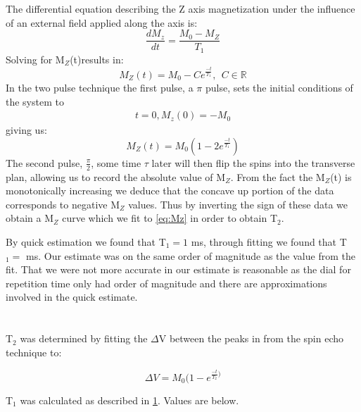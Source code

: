 \documentclass[11pt,letterpaper]{article}
\begin{document}
\section{} %
\label{sec:q3}
The differential equation describing the Z axis magnetization under the influence of an external field applied along the axis is:
\begin{equation}
\frac{dM_z}{dt}=\frac{M_0 - M_Z}{T_1}
\end{equation}
Solving for M$_Z$(t)results in:
\begin{equation}
M_Z(t) = M_0-Ce^{\frac{-t}{T_1}}, \ \ C\in \mathbb{R}
\end{equation}
In the two pulse technique the first pulse, a $\pi$ pulse, sets the initial conditions of the system to 
\begin{align*}
t=0, M_z(0)=-M_0
\end{align*} giving us:
\begin{equation}
\label{eq:Mz}
M_Z(t) = M_0(1-2e^{\frac{-t}{T_1}})
\end{equation}
The second pulse, $\frac{\pi}{2}$, some time $\tau$ later will then flip the spins into the transverse plan, allowing us to record the absolute value of M$_Z$. From the fact the M$_Z$(t) is monotonically increasing we deduce that the concave up portion of the data corresponds to negative M$_Z$ values. Thus by inverting the sign of these data we obtain a M$_Z$ curve which we fit to \ref{eq:Mz} in order to obtain T$_2$.


By quick estimation we found that T$_1=1$ ms, through fitting we found that T$_1=   $ ms. Our estimate was on the same order of magnitude as the value from the fit. That we were not more accurate in our estimate is reasonable as the dial for repetition time only had order of magnitude and there are approximations involved in the quick estimate.




\section{} %



T$_2$ was determined by fitting the $\Delta$V between the peaks in from the spin echo technique to:

\begin{equation}
\Delta V=M_0(1-e^{\frac{-t}{T_2})}
\end{equation}

T$_1$ was calculated as described in \ref*{sec:q3}. Values are below.
\end{document}
